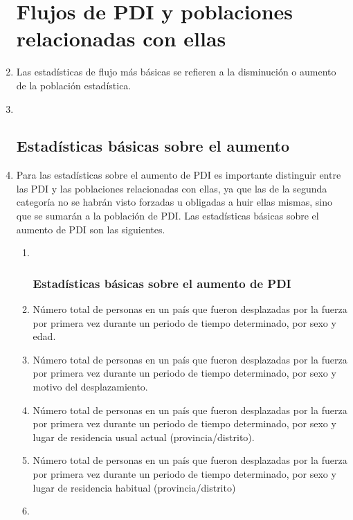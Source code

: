\documentclass[
]{book}
\begin{document}
\begin{enumerate}
{  \section{Flujos de PDI y poblaciones relacionadas con ellas}\label{flujos-de-pdi-y-poblaciones-relacionadas-con-ellas}}
\item
  Las estadísticas de flujo más básicas se refieren a la disminución o aumento de la población estadística.
\item ~
  \hypertarget{estaduxedsticas-buxe1sicas-sobre-el-aumento}{%
  \subsection{Estadísticas básicas sobre el aumento}\label{estaduxedsticas-buxe1sicas-sobre-el-aumento}}
\item
  Para las estadísticas sobre el aumento de PDI es importante distinguir entre las PDI y las poblaciones relacionadas con ellas, ya que las de la segunda categoría no se habrán visto forzadas u obligadas a huir ellas mismas, sino que se sumarán a la población de PDI. Las estadísticas básicas sobre el aumento de PDI son las siguientes.

  \begin{enumerate}
  \def\labelenumii{\arabic{enumii}.}
  \item ~
    \hypertarget{estaduxedsticas-buxe1sicas-sobre-el-aumento-de-pdi}{%
    \subsubsection{Estadísticas básicas sobre el aumento de PDI}\label{estaduxedsticas-buxe1sicas-sobre-el-aumento-de-pdi}}
  \item
    Número total de personas en un país que fueron desplazadas por la fuerza por primera vez durante un periodo de tiempo determinado, por sexo y edad.
  \item
    Número total de personas en un país que fueron desplazadas por la fuerza por primera vez durante un periodo de tiempo determinado, por sexo y motivo del desplazamiento.
  \item
    Número total de personas en un país que fueron desplazadas por la fuerza por primera vez durante un periodo de tiempo determinado, por sexo y lugar de residencia usual actual (provincia/distrito).
  \item
    Número total de personas en un país que fueron desplazadas por la fuerza por primera vez durante un periodo de tiempo determinado, por sexo y lugar de residencia habitual (provincia/distrito)
  \item ~
    \hypertarget{estaduxedsticas-buxe1sicas-sobre-el-aumento-de-personas-relacionadas-con-pdi}{%
}
\end{enumerate}
\end{enumerate}
\end{document}

